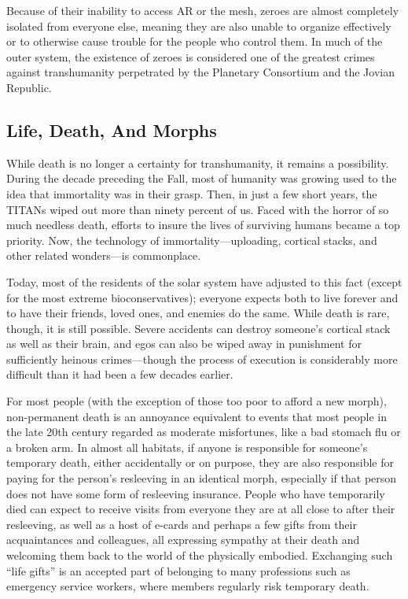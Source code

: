 Because of their inability to access AR or the mesh, 
zeroes are almost completely isolated from everyone 
else, meaning they are also unable to organize effectively
or to otherwise cause trouble for the people
who control them. In much of the outer system, the 
existence of zeroes is considered one of the greatest 
crimes against transhumanity perpetrated by the Planetary
Consortium and the Jovian Republic.

\subsection{Life, Death, And Morphs}

While death is no longer a certainty for transhumanity, 
it remains a possibility. During the decade preceding 
the Fall, most of humanity was growing used to the 
idea that immortality was in their grasp. Then, in just 
a few short years, the TITANs wiped out more than 
ninety percent of us. Faced with the horror of so much 
needless death, efforts to insure the lives of surviving 
humans became a top priority. Now, the technology 
of immortality—uploading, cortical stacks, and other 
related wonders—is commonplace.

Today, most of the residents of the solar system 
have adjusted to this fact (except for the most extreme 
bioconservatives); everyone expects both to live forever 
and to have their friends, loved ones, and enemies do 
the same. While death is rare, though, it is still possible. 
Severe accidents can destroy someone's cortical stack 
as well as their brain, and egos can also be wiped away 
in punishment for sufficiently heinous crimes—though 
the process of execution is considerably more difficult 
than it had been a few decades earlier.

For most people (with the exception of those too 
poor to afford a new morph), non-permanent death is 
an annoyance equivalent to events that most people in 
the late 20th century regarded as moderate misfortunes, 
like a bad stomach flu or a broken arm. In almost all 
habitats, if anyone is responsible for someone's temporary
death, either accidentally or on purpose, they are
also responsible for paying for the person's resleeving 
in an identical morph, especially if that person does not 
have some form of resleeving insurance. People who 
have temporarily died can expect to receive visits from 
everyone they are at all close to after their resleeving, 
as well as a host of e-cards and perhaps a few gifts 
from their acquaintances and colleagues, all expressing 
sympathy at their death and welcoming them back to 
the world of the physically embodied. Exchanging such 
``life gifts'' is an accepted part of belonging to many 
professions such as emergency service workers, where 
members regularly risk temporary death.

